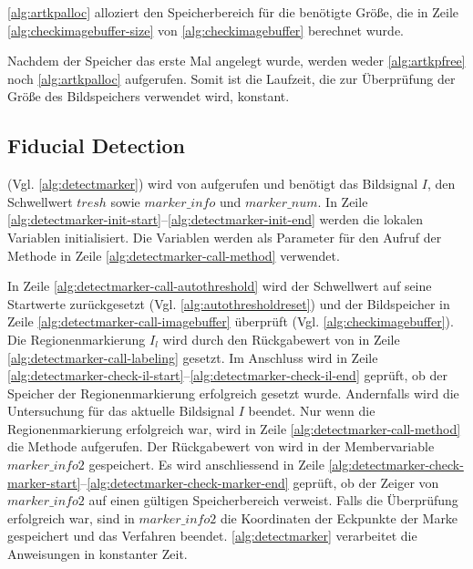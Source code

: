 \autoref{alg:artkpalloc} alloziert den Speicherbereich für die benötigte Größe, die in Zeile
 \ref{alg:checkimagebuffer-size} von \autoref{alg:checkimagebuffer} berechnet wurde.



Nachdem der Speicher das erste Mal angelegt wurde, werden weder \autoref{alg:artkpfree} noch \autoref{alg:artkpalloc}
 aufgerufen. Somit ist die Laufzeit, die zur Überprüfung der Größe des Bildspeichers verwendet wird, konstant.



\subsection{Fiducial Detection} %
\label{sec:fiducial_detection}

 (Vgl. \autoref{alg:detectmarker}) wird von  aufgerufen und benötigt das
 Bildsignal $I$, den Schwellwert $\mathit{tresh}$ sowie $\mathit{marker\_info}$ und $\mathit{marker\_num}$. In Zeile
 \ref{alg:detectmarker-init-start}--\ref{alg:detectmarker-init-end} werden die lokalen Variablen initialisiert. Die
 Variablen werden als Parameter für den Aufruf der Methode  in Zeile
 \ref{alg:detectmarker-call-method} verwendet.



In Zeile \ref{alg:detectmarker-call-autothreshold} wird der Schwellwert auf seine Startwerte zurückgesetzt
 (Vgl. \autoref{alg:autothresholdreset}) und der Bildspeicher in Zeile \ref{alg:detectmarker-call-imagebuffer}
 überprüft (Vgl. \autoref{alg:checkimagebuffer}). Die Regionenmarkierung $I_l$ wird durch den Rückgabewert von
  in Zeile \ref{alg:detectmarker-call-labeling} gesetzt. Im Anschluss wird in Zeile
 \ref{alg:detectmarker-check-il-start}--\ref{alg:detectmarker-check-il-end} geprüft, ob der Speicher der
 Regionenmarkierung erfolgreich gesetzt wurde. Andernfalls wird die Untersuchung für das aktuelle Bildsignal $I$
 beendet. Nur wenn die Regionenmarkierung erfolgreich war, wird in Zeile \ref{alg:detectmarker-call-method} die Methode
  aufgerufen. Der Rückgabewert von  wird in der Membervariable
 $\mathit{marker\_info2}$ gespeichert. Es wird anschliessend in Zeile
 \ref{alg:detectmarker-check-marker-start}--\ref{alg:detectmarker-check-marker-end} geprüft, ob der Zeiger von
 $\mathit{marker\_info2}$ auf einen gültigen Speicherbereich verweist. Falls die Überprüfung erfolgreich war, sind in
 $\mathit{marker\_info2}$ die Koordinaten der Eckpunkte der Marke gespeichert und das Verfahren beendet.
 \autoref{alg:detectmarker} verarbeitet die Anweisungen in konstanter Zeit.

